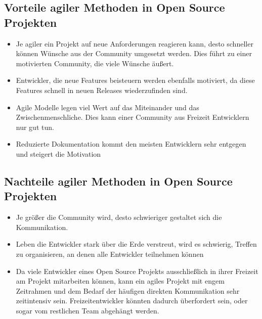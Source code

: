 \subsection{Vorteile agiler Methoden in Open Source Projekten}

\begin{itemize}
	\item Je agiler ein Projekt auf neue Anforderungen reagieren kann, desto schneller können Wünsche aus der Community umgesetzt werden. Dies führt zu einer motivierten Community, die viele Wünsche äußert.
	\item Entwickler, die neue Features beisteuern werden ebenfalls motiviert, da diese Features schnell in neuen Releases wiederzufinden sind.
	\item Agile Modelle legen viel Wert auf das Miteinander und das Zwischenmenschliche. Dies kann einer Community aus Freizeit Entwicklern nur gut tun.
	\item Reduzierte Dokumentation kommt den meisten Entwicklern sehr entgegen und steigert die Motivation
\end{itemize}
  
\subsection{Nachteile agiler Methoden in Open Source Projekten}
\begin{itemize}
	\item Je größer die Community wird, desto schwieriger gestaltet sich die Kommunikation.
	\item Leben die Entwickler stark über die Erde verstreut, wird es schwierig, Treffen zu organisieren, an denen alle Entwickler teilnehmen können
	\item Da viele Entwickler eines Open Source Projekts ausschließlich in ihrer Freizeit am Projekt mitarbeiten können, kann ein agiles Projekt mit engem Zeitrahmen und dem Bedarf der häufigen direkten Kommunikation sehr zeitintensiv sein. Freizeitentwickler könnten dadurch überfordert sein, oder sogar vom restlichen Team abgehängt werden.
\end{itemize}

